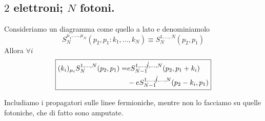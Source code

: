 \documentclass[../main.tex]{subfiles}
\begin{document}
\subsection{$2$ elettroni; $N$ fotoni.}
\begin{theorem}
    Consideriamo un diagramma come quello a lato e denominiamolo 
    \[S_N^{\mu_1,...,\mu_N}(p_2,p_1: k_1, ... , k_N) \equiv S_N^{1,...,N}(p_2,p_1)\]
    Allora \(\forall i\)
    \begin{equation}
        \boxed{
        \begin{aligned}
            (k_i)_{\mu_i}S_N^{1,...,N}(p_2,p_1) = &eS_{N-1}^{1,...,\cancel i, ...,N}(p_2,p_1 + k_i) \\
            &- eS_{N-1}^{1,...,\cancel i, ...,N}(p_2 - k_i,p_1)
        \end{aligned}}
        \label{eq:WT_ID_2electr_Nphotons}
    \end{equation}
\end{theorem}
Includiamo i propagatori sulle linee fermioniche, mentre non lo facciamo su quelle fotoniche, che di fatto sono amputate.
\end{document}
